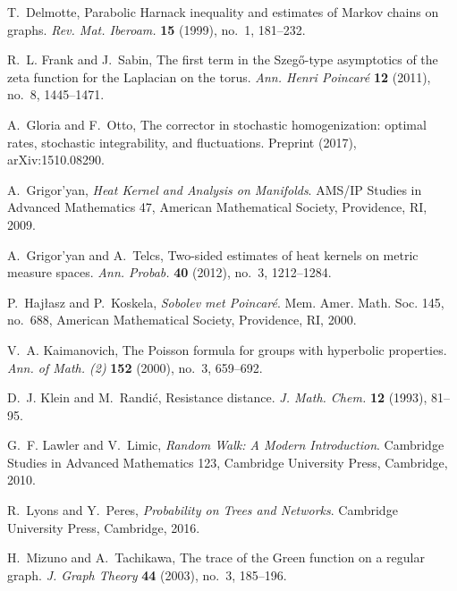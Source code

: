 \documentclass{article}
\numberwithin{equation}{section}
\theoremstyle{definition}
\theoremstyle{remark}
\begin{document}
\begin{thebibliography}{99}
T.~Delmotte, Parabolic Harnack inequality and estimates of Markov chains on graphs.
\emph{Rev. Mat. Iberoam.} \textbf{15} (1999), no.~1, 181--232.

R.~L. Frank and J.~Sabin, The first term in the Szeg\H{o}-type asymptotics of the zeta function for the Laplacian on the torus.
\emph{Ann. Henri Poincar\'e} \textbf{12} (2011), no.~8, 1445--1471.

A.~Gloria and F.~Otto, The corrector in stochastic homogenization: optimal rates, stochastic integrability, and fluctuations.
Preprint (2017), arXiv:1510.08290.

A.~Grigor'yan, \emph{Heat Kernel and Analysis on Manifolds}.
AMS/IP Studies in Advanced Mathematics 47, American Mathematical Society, Providence, RI, 2009.

A.~Grigor'yan and A.~Telcs, Two-sided estimates of heat kernels on metric measure spaces.
\emph{Ann. Probab.} \textbf{40} (2012), no.~3, 1212--1284.

P.~Hajłasz and P.~Koskela, \emph{Sobolev met Poincaré}.
Mem. Amer. Math. Soc. 145, no.~688, American Mathematical Society, Providence, RI, 2000.

V.~A. Kaimanovich, The Poisson formula for groups with hyperbolic properties.
\emph{Ann. of Math. (2)} \textbf{152} (2000), no.~3, 659--692.

D.~J. Klein and M.~Randi{\'c}, Resistance distance.
\emph{J. Math. Chem.} \textbf{12} (1993), 81--95.

G.~F. Lawler and V.~Limic, \emph{Random Walk: A Modern Introduction}.
Cambridge Studies in Advanced Mathematics 123, Cambridge University Press, Cambridge, 2010.

R.~Lyons and Y.~Peres, \emph{Probability on Trees and Networks}.
Cambridge University Press, Cambridge, 2016.

H.~Mizuno and A.~Tachikawa, The trace of the Green function on a regular graph.
\emph{J. Graph Theory} \textbf{44} (2003), no.~3, 185--196.

\end{thebibliography}
\end{document}
